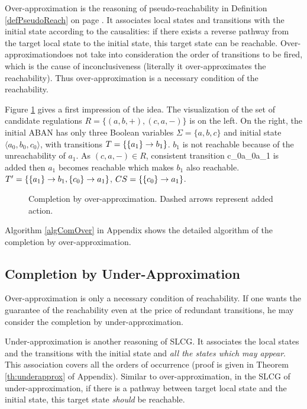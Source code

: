 Over-approximation is the reasoning of pseudo-reachability in Definition \ref{defPseudoReach} on page \pageref{defPseudoReach}. 
It associates local states and transitions with the initial state according to the causalities: if there exists a reverse pathway from the target local state to the initial state, this target state can be reachable.
Over-approximationdoes not take into consideration the order of transitions to be fired, which is the cause of inconclusiveness (literally it over-approximates the reachability).
Thus over-approximation is a necessary condition of the reachability.

Figure \ref{CompOv} gives a first impression of the idea.
The visualization of the set of candidate regulations $R=\{(a,b,+),(c,a,-)\}$ is on the left.
On the right, the initial ABAN has only three Boolean variables $\Sigma=\{a,b,c\}$ and initial state $\langle a_0,b_0,c_0\rangle$, with transitions $T=\{\acm{a_1}{b_0}{b_1}\}$.
$b_1$ is not reachable because of the unreachability of $a_1$.
As $(c,a,-)\in R$, consistent transition \ac{c_0}{a_0}{a_1} is added then $a_1$ becomes reachable which makes $b_1$ also reachable.
$T'=\{\acm{a_1}{b_0}{b_1},\acm{c_0}{a_0}{a_1}\}$, $CS=\{\acm{c_0}{a_0}{a_1}\}$.

\begin{figure}[ht]
\centering

\caption[Completion by over-approximation]{Completion by over-approximation. Dashed arrows represent added action.}\label{CompOv}
\end{figure}
Algorithm \ref{algComOver} in Appendix shows the detailed algorithm of the completion by over-approximation.

\subsection{Completion by Under-Approximation}\label{sec:completionUnder}
Over-approximation is only a necessary condition of reachability.
If one wants the guarantee of the reachability even at the price of redundant transitions, he may consider the completion by under-approximation.

Under-approximation is another reasoning of SLCG. 
It associates the local states and the transitions with the initial state and \textit{all the states which may appear}.
This association covers all the orders of occurrence (proof is given in Theorem \ref{th:underapprox} of Appendix).
Similar to over-approximation, in the SLCG of under-approximation, if there is a pathway between target local state and the initial state, this target state \textit{should} be reachable.

